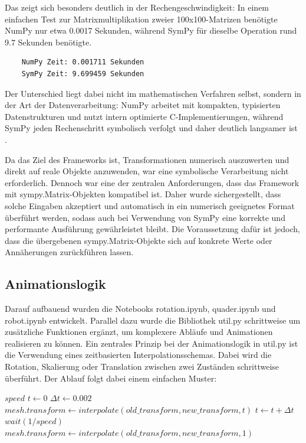 Das zeigt sich besonders deutlich in der Rechengeschwindigkeit: In einem einfachen Test zur Matrixmultiplikation zweier 100x100-Matrizen benötigte NumPy nur etwa 0.0017
Sekunden, während SymPy für dieselbe Operation rund 9.7 Sekunden benötigte.
\begin{center}
    \begin{verbatim}
    NumPy Zeit: 0.001711 Sekunden
    SymPy Zeit: 9.699459 Sekunden
    \end{verbatim}
\end{center}
Der Unterschied liegt dabei nicht im mathematischen Verfahren selbst,
sondern in der Art der Datenverarbeitung: NumPy arbeitet mit kompakten, typisierten Datenstrukturen und nutzt intern optimierte C-Implementierungen,
während SymPy jeden Rechenschritt symbolisch verfolgt und daher deutlich langsamer ist .

Da das Ziel des Frameworks ist, Transformationen numerisch auszuwerten und direkt auf reale Objekte anzuwenden,
war eine symbolische Verarbeitung nicht erforderlich. Dennoch war eine der zentralen Anforderungen, dass das Framework mit sympy.Matrix-Objekten kompatibel ist.
Daher wurde sichergestellt, dass solche Eingaben akzeptiert und automatisch in ein numerisch geeignetes Format überführt werden,
sodass auch bei Verwendung von SymPy eine korrekte und performante Ausführung gewährleistet bleibt. Die Voraussetzung dafür ist jedoch,
dass die über\-gebenen sympy.Ma\-trix-Objekte sich auf konkrete Werte oder Annäherungen zurückführen lassen.

\subsection{Animationslogik}
Darauf aufbauend wurden die Notebooks rotation.ipynb, quader.ipynb und robot.ipynb entwickelt. Parallel dazu wurde die Bibliothek util.py
schrittweise um zusätzliche Funktionen ergänzt, um komplexere Abläufe und Animationen realisieren zu können.
Ein zentrales Prinzip bei der Animationslogik in util.py ist die Verwendung eines zeitbasierten Interpolationsschemas.
Dabei wird die Rotation, Skalierung oder Translation zwischen zwei Zuständen schrittweise überführt.
Der Ablauf folgt dabei einem einfachen Muster:

\begin{algorithm}
    \caption{Interpolation einer Transformation}
    \begin{algorithmic}[1]
    \State $speed$ 
    \State $t \gets 0$
    \State $\Delta t \gets 0.002$
        \State $mesh.transform \gets \mathit{interpolate}(old\_transform, new\_transform, t)$
        \State $t \gets t + \Delta t$
        \State $\mathit{wait}(1/speed)$
    \EndWhile
    \State $mesh.transform \gets \mathit{interpolate}(old\_transform, new\_transform, 1)$
    \end{algorithmic}
\end{algorithm}

